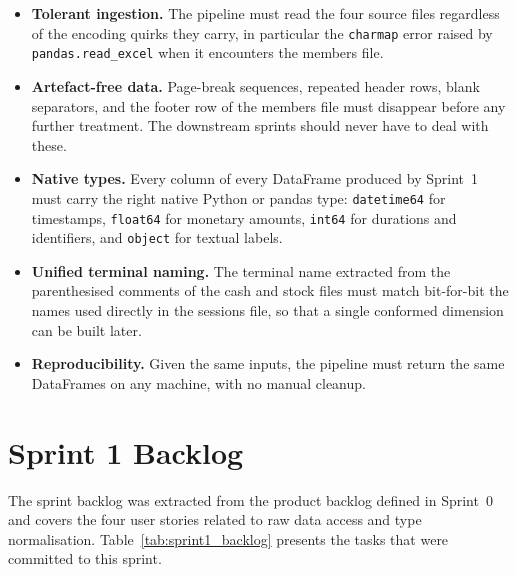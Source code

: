 \begin{itemize}
  \item \textbf{Tolerant ingestion.} The pipeline must read the four source
        files regardless of the encoding quirks they carry, in particular
        the \texttt{charmap} error raised by \texttt{pandas.read\_excel}
        when it encounters the members file.
  \item \textbf{Artefact-free data.} Page-break sequences, repeated header
        rows, blank separators, and the footer row of the members file
        must disappear before any further treatment. The downstream sprints
        should never have to deal with these.
  \item \textbf{Native types.} Every column of every DataFrame produced by
        Sprint~1 must carry the right native Python or pandas type:
        \texttt{datetime64} for timestamps, \texttt{float64} for monetary
        amounts, \texttt{int64} for durations and identifiers, and
        \texttt{object} for textual labels.
  \item \textbf{Unified terminal naming.} The terminal name extracted from
        the parenthesised comments of the cash and stock files must match
        bit-for-bit the names used directly in the sessions file, so that
        a single conformed dimension can be built later.
  \item \textbf{Reproducibility.} Given the same inputs, the pipeline must
        return the same DataFrames on any machine, with no manual cleanup.
\end{itemize}

\section{Sprint 1 Backlog}

The sprint backlog was extracted from the product backlog defined in Sprint~0 and
covers the four user stories related to raw data access and type normalisation.
Table~\ref{tab:sprint1_backlog} presents the tasks that were committed to this sprint.

